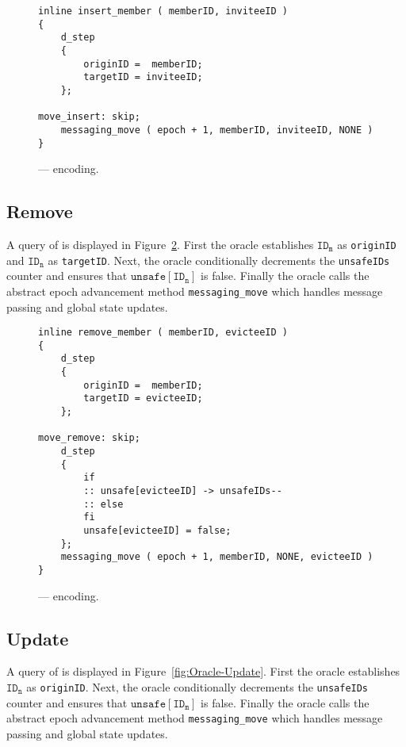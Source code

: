 \begin{figure}[ht!]
  \centering
  \caption{\label{fig:Oracle-Insert}\CGKAmod{}{}{} ---  encoding.}
\begin{verbatim}
inline insert_member ( memberID, inviteeID )
{
    d_step
    {
        originID =  memberID;
        targetID = inviteeID;
    };

move_insert: skip;
    messaging_move ( epoch + 1, memberID, inviteeID, NONE )
}
\end{verbatim}
\end{figure}


\hypertarget{remove}{%
\subsection{Remove}\label{remove}}

A query of  is displayed in Figure\ \ref{fig:Oracle-Remove}.
First the oracle establishes \(\mathtt{ID_m}\) as \texttt{originID} and \(\mathtt{ID_n}\) as \texttt{targetID}.
Next, the oracle conditionally decrements the \texttt{unsafeIDs} counter and ensures that \(\mathtt{unsafe[ID_n]}\) is false.
Finally the oracle calls the abstract epoch advancement method \texttt{messaging\_move} which handles message passing and global state updates.

\begin{figure}[ht!]
  \centering
  \caption{\label{fig:Oracle-Remove}\CGKAmod{}{}{} ---  encoding.}
\begin{verbatim}
inline remove_member ( memberID, evicteeID )
{
    d_step
    {
        originID =  memberID;
        targetID = evicteeID;
    };

move_remove: skip;
    d_step
    {
        if
        :: unsafe[evicteeID] -> unsafeIDs--
        :: else
        fi
        unsafe[evicteeID] = false;
    };
    messaging_move ( epoch + 1, memberID, NONE, evicteeID )
}
\end{verbatim}
\end{figure}


\hypertarget{sec:update}{%
\subsection{Update}\label{sec:update}}

A query of  is displayed in Figure\ \ref{fig:Oracle-Update}.
First the oracle establishes \(\mathtt{ID_n}\) as \texttt{originID}.
Next, the oracle conditionally decrements the \texttt{unsafeIDs} counter and ensures that \(\mathtt{unsafe[ID_m]}\) is false.
Finally the oracle calls the abstract epoch advancement method \texttt{messaging\_move} which handles message passing and global state updates.

